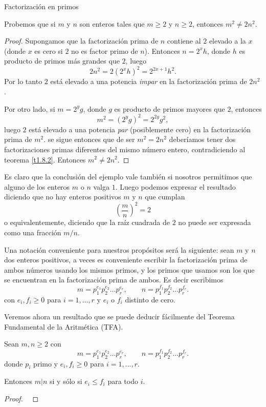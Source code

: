 \begin{section}{Factorización en primos}
\begin{ejemplo*} Probemos que si $m$ y $n$ son enteros tales que $m\ge 2$ y $n\ge 2$, entonces $m^2  \not=2n^2$.
\end{ejemplo*}
\begin{proof} Supongamos que la factorización prima de $n$ contiene al $2$ elevado a la $x$ (donde $x$ es cero si $2$ no es factor primo de $n$). Entonces $n=2^xh$, donde $h$ es producto de primos más grandes que $2$, luego 
$$
2n^2=2(2^xh)^2= 2^{2x+1}h^2.
$$
Por lo tanto $2$ está elevado a una potencia \textit{impar} en la factorización prima de $2n^2$.

Por otro lado, si $m=2^yg$, donde $g$ es producto de primos mayores que $2$, entonces
$$
m^2= (2^yg)^2 = 2^{2y}g^2,
$$
luego $2$ está elevado a una potencia \textit{par} (posiblemente cero) en la factorización prima de $m^2$. se sigue entonces que de ser $m^2 = 2n^2$ deberíamos tener dos factorizaciones primas diferentes del mismo número entero, contradiciendo al teorema \ref{t1.8.2}. Entonces $m^2 \not= 2n^2$.
\end{proof}

Es claro que la conclusión del ejemplo  vale también si nosotros permitimos que alguno de los enteros $m$ o $n$ valga $1$. Luego podemos expresar el resultado diciendo que no hay enteros positivos $m$ y $n$ que cumplan 
$$
\left(\frac{m}{n}\right)^2 =2
$$
o equivalentemente, diciendo que la raíz cuadrada de $2$ no puede ser expresada como una fracción $m/n$.

Una notación conveniente para nuestros propósitos será la siguiente: sean $m$ y $n$ dos enteros positivos, a veces es conveniente escribir la factorización prima de ambos números usando los mismos primos, y los primos que usamos son los que se encuentran en la factorización prima de ambos. Es decir  escribimos
$$
m=p_1^{e_1}p_2^{e_2}\ldots p_r^{e_r},\qquad
n=p_1^{f_1}p_2^{f_2}\ldots p_r^{f_r}.
$$
con $e_i,f_i \ge 0$ para $i=1,\ldots,r$ y $e_i$ o $f_i$ distinto de cero. 
 
Veremos ahora un resultado que se puede deducir fácilmente del Teorema Fundamental de la Aritmética (TFA).

\begin{proposicion} Sean $m,n \ge2$ con
$$
m=p_1^{e_1}p_2^{e_2}\ldots p_r^{e_r},\qquad
n=p_1^{f_1}p_2^{f_2}\ldots p_r^{f_r}.
$$
donde $p_i$ primo y $e_i,f_i \ge 0$ para $i=1,\ldots,r$. 

Entonces $m|n$ si y sólo si $e_i \le f_i$ para todo $i$.
\end{proposicion}
\begin{proof}
\
    

\end{proof}
\end{section}
